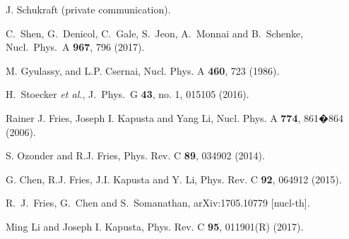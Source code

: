 \documentclass[aps,prc,twocolumn,floatfix,showpacs,a4paper,
nofootinbib,amsmath,amssymb]{revtex4-1}
\begin{document}
\begin{thebibliography}{99}
J. Schukraft (private communication).

  C.~Shen, G.~Denicol, C.~Gale, S.~Jeon, A.~Monnai and B.~Schenke,
  Nucl.\ Phys.\ A {\bf 967}, 796 (2017).


 
M. Gyulassy, and L.P. Csernai, Nucl. Phys. A {\bf 460}, 723 (1986).


 
  H.~Stoecker {\it et al.},
  J.\ Phys.\ G {\bf 43}, no. 1, 015105 (2016).
 


Rainer J. Fries, Joseph I. Kapusta and Yang Li,
Nucl. Phys. A {\bf 774}, 861�864 (2006).



S. Ozonder and R.J. Fries,
Phys. Rev. C {\bf 89}, 034902 (2014).

G. Chen, R.J. Fries, J.I. Kapusta and Y. Li,
Phys. Rev. C {\bf 92}, 064912 (2015).



    
  R.~J.~Fries, G.~Chen and S.~Somanathan,
  arXiv:1705.10779 [nucl-th].
  
Ming Li and Joseph I. Kapusta,
Phys. Rev. C {\bf 95}, 011901(R) (2017).

  

\end{thebibliography}
\end{document}
